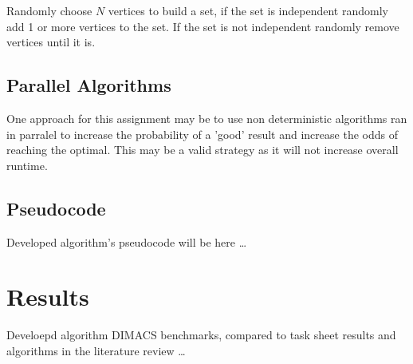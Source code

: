 \documentclass[conference]{IEEEtran}
\begin{document}
Randomly choose $N$ vertices to build a set, if the set is independent randomly add 1 or more vertices to the set.
If the set is not independent randomly remove vertices until it is.

\subsection{Parallel Algorithms}
One approach for this assignment may be to use non deterministic algorithms ran in parralel to increase the probability of a
'good' result and increase the odds of reaching the optimal. This may be a valid strategy as it will not increase overall
runtime.

\subsection{Pseudocode}

Developed algorithm's pseudocode will be here \dots

\section{Results}

Develoepd algorithm DIMACS benchmarks, compared to task sheet results and algorithms in the literature review \dots
\end{document}
